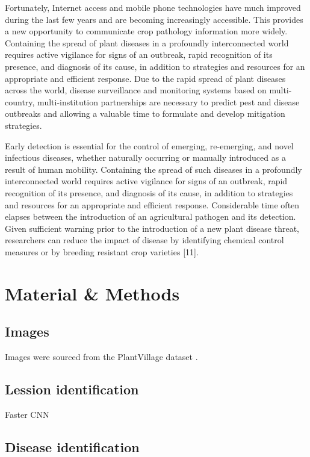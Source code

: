 \documentclass{frontiersSCNS} %
\begin{document}
Fortunately, Internet access and mobile phone technologies have much improved during the last few years and are becoming increasingly accessible. This provides a new opportunity to communicate crop pathology information more widely. Containing the spread of plant diseases in a profoundly interconnected world requires active vigilance for signs of an outbreak, rapid recognition of its presence, and diagnosis of its cause, in addition to strategies and resources for an appropriate and efficient response. Due to the rapid spread of plant diseases across the world, disease surveillance and monitoring systems based on multi-country, multi-institution partnerships are necessary to predict pest and disease outbreaks and allowing a valuable time to formulate and develop mitigation strategies. 

Early detection is essential for the control of emerging, re-emerging, and novel infectious diseases, whether naturally occurring or manually introduced as a result of human mobility. Containing the spread of such diseases in a profoundly interconnected world requires active vigilance for signs of an outbreak, rapid recognition of its presence, and diagnosis of its cause, in addition to strategies and resources for an appropriate and efficient response. Considerable time often elapses between the introduction of an agricultural pathogen and its detection. Given sufficient warning prior to the introduction of a new plant disease threat, researchers can reduce the impact of disease by identifying chemical control measures or by breeding resistant crop varieties [11].  

\section{Material \& Methods}

\subsection{Images}
Images  were  sourced from  the  PlantVillage  dataset \cite{hughes2015open}. 

\subsection{Lession identification}

Faster CNN

\subsection{Disease identification}
\end{document}
